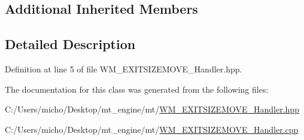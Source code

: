 \subsection*{Additional Inherited Members}


\subsection{Detailed Description}


Definition at line 5 of file W\+M\+\_\+\+E\+X\+I\+T\+S\+I\+Z\+E\+M\+O\+V\+E\+\_\+\+Handler.\+hpp.



The documentation for this class was generated from the following files\+:\begin{DoxyCompactItemize}
\item 
C\+:/\+Users/micho/\+Desktop/mt\+\_\+engine/mt/\hyperlink{_w_m___e_x_i_t_s_i_z_e_m_o_v_e___handler_8hpp}{W\+M\+\_\+\+E\+X\+I\+T\+S\+I\+Z\+E\+M\+O\+V\+E\+\_\+\+Handler.\+hpp}\item 
C\+:/\+Users/micho/\+Desktop/mt\+\_\+engine/mt/\hyperlink{_w_m___e_x_i_t_s_i_z_e_m_o_v_e___handler_8cpp}{W\+M\+\_\+\+E\+X\+I\+T\+S\+I\+Z\+E\+M\+O\+V\+E\+\_\+\+Handler.\+cpp}\end{DoxyCompactItemize}
